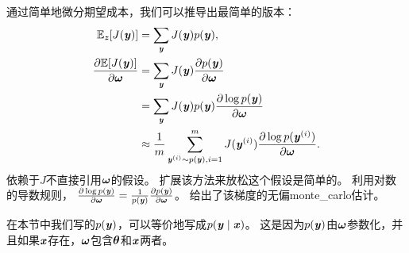 通过简单地微分期望成本，我们可以推导出最简单的版本：
\begin{align}
 \SetE_{\Vz}[J(\Vy)] &= \sum_{\Vy} J(\Vy) p(\Vy), \\
 \frac{\partial \SetE[J(\Vy)]}{\partial \Vomega} &= \sum_{\Vy} J(\Vy)
 \frac{\partial p(\Vy)}{\partial \Vomega} \label{eq:sum_exp} \\
 &=  \sum_{\Vy} J(\Vy) p(\Vy) \frac{\partial\log p(\Vy)}{\partial \Vomega} 
 \label{eq:sum_log} \\
 & \approx \frac{1}{m} \sum_{\Vy^{(i)} \sim p(\Vy), i=1}^m 
 J(\Vy^{(i)}) \frac{\partial\log p(\Vy^{(i)})}{\partial \Vomega}. \label{eq:sum_prob}
\end{align}
依赖于$J$不直接引用$\Vomega$的假设。
扩展该方法来放松这个假设是简单的。
利用对数的导数规则，
$\frac{\partial\log p(\Vy)}{\partial \Vomega} = \frac{1}{p(\Vy)}
\frac{\partial p(\Vy)}{\partial \Vomega}$。
给出了该梯度的无偏\gls{monte_carlo}估计。


在本节中我们写的$p(\Vy)$，可以等价地写成$p(\Vy  \mid  \Vx)$。
这是因为$p(\Vy)$由$\Vomega$参数化，并且如果$\Vx$存在，$\Vomega$包含$\Vtheta$和$\Vx$两者。

